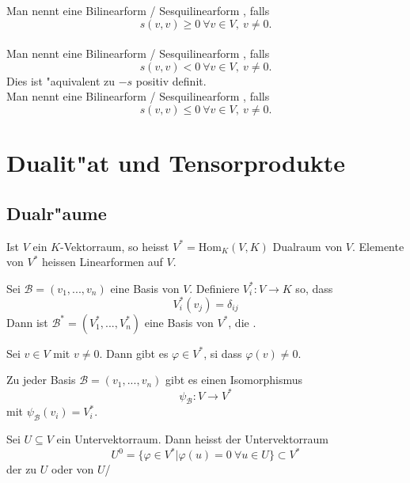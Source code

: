 \documentclass[11pt, a4paper]{article}
\begin{document}
\begin{definition}
Man nennt eine Bilinearform / Sesquilinearform , falls 
$$
s(v,v) \geq 0 \ \forall v \in V, \ v \neq 0.
$$
\\
Man nennt eine Bilinearform / Sesquilinearform , falls 
$$
s(v,v) < 0 \ \forall  v \in V, \ v \neq 0.
$$
Dies ist "aquivalent zu $-s$ positiv definit.
\\
Man nennt eine Bilinearform / Sesquilinearform , falls 
$$
s(v,v) \leq 0 \  \forall v \in V, \ v \neq 0.
$$
\end{definition}


\section{Dualit"at und Tensorprodukte}
\subsection{Dualr"aume}
\begin{definition}
Ist $V$ ein $K$-Vektorraum, so heisst $V^* = \mathrm{Hom}_K(V, K)$ Dualraum von $V$. Elemente von $V^*$ heissen Linearformen auf $V$.
\end{definition}
 

\begin{remark}
Sei $\mathcal{B} = (v_1, ..., v_n)$ eine Basis von $V$. Definiere $V_i^*: V \rightarrow K$ so, dass 
$$
V_i^*(v_j) = \delta_{ij}
$$
Dann ist $\mathcal{B}^* = (V^*_1, ..., V^*_n)$ eine Basis von $V^*$, die .
\end{remark}

\begin{corollary}
Sei $v \in V$ mit $v \neq 0$. Dann gibt es $\varphi \in V^*$, si dass $\varphi (v) \neq 0$.
\end{corollary}

\begin{corollary}
Zu jeder Basis $\mathcal{B} = (v_1, ..., v_n)$ gibt es einen Isomorphismus
$$
\psi_\mathcal{B} :V \rightarrow V^*
$$ 
mit $\psi_\mathcal{B}(v_i) = V^*_i$.
\end{corollary}
 
\begin{definition}
Sei $U \subseteq V$ ein Untervektorraum. Dann heisst der Untervektorraum
$$
U^0 = \{ \varphi \in V^* | \varphi(u) = 0 \ \forall u \in U \} \subset V^*
$$
der zu $U$  oder  von $U$/
\end{definition}
\end{document}

